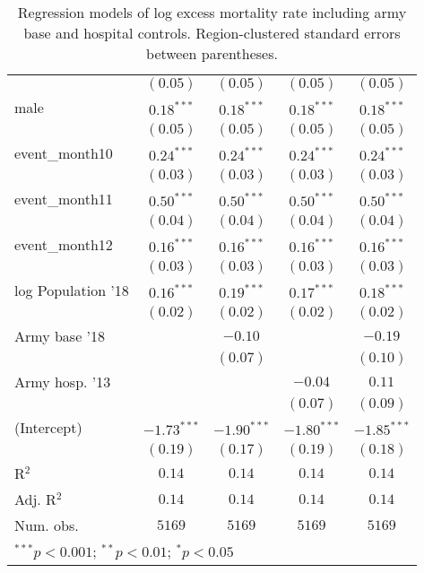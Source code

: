 \begin{table}
\begin{center}
\begin{tabular}{l c c c c}
                   & $(0.05)$      & $(0.05)$      & $(0.05)$      & $(0.05)$      \\
male               & $0.18^{***}$  & $0.18^{***}$  & $0.18^{***}$  & $0.18^{***}$  \\
                   & $(0.05)$      & $(0.05)$      & $(0.05)$      & $(0.05)$      \\
event\_month10     & $0.24^{***}$  & $0.24^{***}$  & $0.24^{***}$  & $0.24^{***}$  \\
                   & $(0.03)$      & $(0.03)$      & $(0.03)$      & $(0.03)$      \\
event\_month11     & $0.50^{***}$  & $0.50^{***}$  & $0.50^{***}$  & $0.50^{***}$  \\
                   & $(0.04)$      & $(0.04)$      & $(0.04)$      & $(0.04)$      \\
event\_month12     & $0.16^{***}$  & $0.16^{***}$  & $0.16^{***}$  & $0.16^{***}$  \\
                   & $(0.03)$      & $(0.03)$      & $(0.03)$      & $(0.03)$      \\
log Population '18 & $0.16^{***}$  & $0.19^{***}$  & $0.17^{***}$  & $0.18^{***}$  \\
                   & $(0.02)$      & $(0.02)$      & $(0.02)$      & $(0.02)$      \\
Army base '18      &               & $-0.10$       &               & $-0.19$       \\
                   &               & $(0.07)$      &               & $(0.10)$      \\
Army hosp. '13     &               &               & $-0.04$       & $0.11$        \\
                   &               &               & $(0.07)$      & $(0.09)$      \\
(Intercept)        & $-1.73^{***}$ & $-1.90^{***}$ & $-1.80^{***}$ & $-1.85^{***}$ \\
                   & $(0.19)$      & $(0.17)$      & $(0.19)$      & $(0.18)$      \\
\hline
R$^2$              & $0.14$        & $0.14$        & $0.14$        & $0.14$        \\
Adj. R$^2$         & $0.14$        & $0.14$        & $0.14$        & $0.14$        \\
Num. obs.          & $5169$        & $5169$        & $5169$        & $5169$        \\
\hline
\multicolumn{5}{l}{\scriptsize{$^{***}p<0.001$; $^{**}p<0.01$; $^{*}p<0.05$}}
\end{tabular}
\caption{Regression models of log excess mortality rate including army base and hospital controls. Region-clustered standard errors between parentheses.}
\label{tab:popdensmodels}
\end{center}
\end{table}
